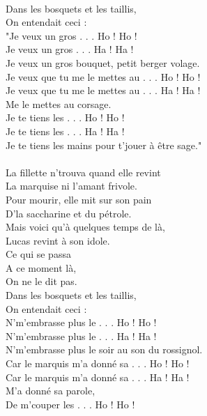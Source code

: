 \\Dans les bosquets et les taillis,
\\On entendait ceci :
\\"Je veux un gros . . . Ho ! Ho !
\\Je veux un gros . . . Ha ! Ha !
\\Je veux un gros bouquet, petit berger volage.
\\Je veux que tu me le mettes au . . . Ho ! Ho !
\\Je veux que tu me le mettes au . . . Ha ! Ha !
\\Me le mettes au corsage.
\\Je te tiens les . . . Ho ! Ho !
\\Je te tiens les . . . Ha ! Ha !
\\Je te tiens les mains pour t’jouer à être sage."
\\\\La fillette n’trouva quand elle revint
\\La marquise ni l’amant frivole.
\\Pour mourir, elle mit sur son pain
\\D’la saccharine et du pétrole.
\\Mais voici qu’à quelques temps de là,
\\Lucas revint à son idole.
\\Ce qui se passa
\\A ce moment là,
\\On ne le dit pas.
\\Dans les bosquets et les taillis,
\\On entendait ceci :
\\N’m’embrasse plus le . . . Ho ! Ho !
\\N’m’embrasse plus le . . . Ha ! Ha !
\\N’m’embrasse plus le soir au son du rossignol.
\\Car le marquis m’a donné sa . . . Ho ! Ho !
\\Car le marquis m’a donné sa . . . Ha ! Ha !
\\M’a donné sa parole,
\\De m’couper les . . . Ho ! Ho !

\breakpage